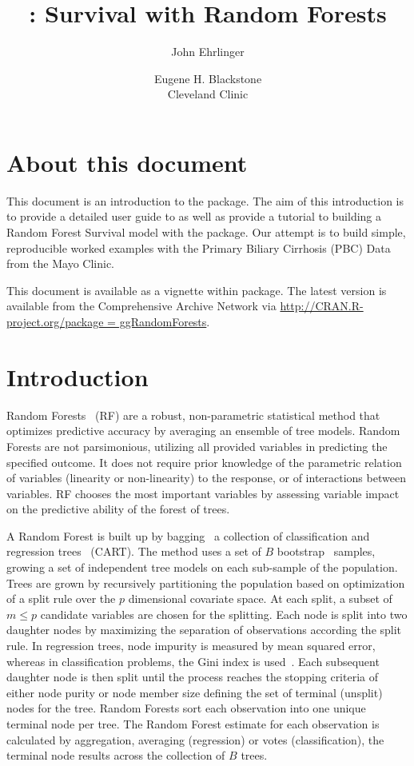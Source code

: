 \documentclass[nojss]{jss}\usepackage[]{graphicx}\usepackage[]{color}
\author{John Ehrlinger 
\and Eugene H. Blackstone\\Cleveland Clinic}
\title{\pkg{ggRandomForests}: Survival with Random Forests}
\begin{document}
\section{About this document}
This document is an introduction to the   package. The aim of this introduction is to provide a detailed user guide to  as well as provide a tutorial to building a Random Forest Survival model with the  package. Our attempt is to build simple, reproducible worked examples with the Primary Biliary Cirrhosis (PBC) Data from the Mayo Clinic.

This document is available as a vignette within  package. The latest version is available from the Comprehensive  Archive Network via \url{http://CRAN.R-project.org/package = ggRandomForests}.

\section{Introduction} \label{S:introduction}

Random Forests~\citep{Breiman:2001} (RF) are a robust, non-parametric statistical method that optimizes predictive accuracy by averaging an ensemble of tree models. Random Forests are not parsimonious, utilizing all provided variables in predicting the specified outcome. It does not require prior knowledge of the parametric relation of variables (linearity or non-linearity) to the response, or of interactions between variables. RF chooses the most important variables by assessing variable impact on the predictive ability of the forest of trees.

A Random Forest is built up by bagging~\citep{Breiman:1996} a collection of classification and regression trees~\citep{cart:1984} (CART). The method uses a set of $B$ bootstrap~\citep{bootstrap:1994} samples, growing a set of independent tree models on each sub-sample of the population. Trees are grown by recursively partitioning the population based on optimization of a split rule over the $p$ dimensional covariate space. At each split, a subset of $m \le p$ candidate variables are chosen for the splitting. Each node is split into two daughter nodes by maximizing the separation of observations according the split rule. In regression trees, node impurity is measured by mean squared error, whereas in classification problems, the Gini index is used~\citep{FriedmanGreedyfunction:2000}. Each subsequent daughter node is then split until the process reaches the stopping criteria of either node purity or node member size defining the set of terminal (unsplit) nodes for the tree. Random Forests sort each observation into one unique terminal node per tree. The Random Forest estimate for each observation is calculated by aggregation, averaging (regression) or votes (classification), the terminal node results across the collection of $B$ trees. 
\end{document}

